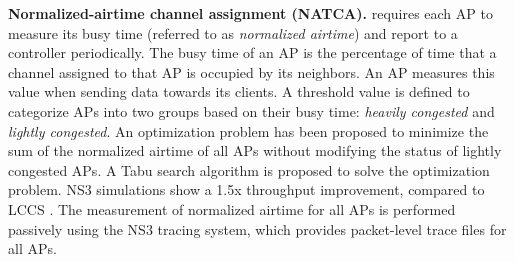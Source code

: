 %
\label{ATCM}
\textbf{Normalized-airtime channel assignment (NATCA).}
\cite{DCA-residential-2015} requires each AP to measure its busy time (referred to as \textit{normalized airtime}) and report to a controller periodically. 
The busy time of an AP is the percentage of time that a channel assigned to that AP is occupied by its neighbors. 
An AP measures this value when sending data towards its clients. 
A threshold value is defined to categorize APs into two groups based on their busy time: \textit{heavily congested} and \textit{lightly congested}. 
An optimization problem has been proposed to minimize the sum of the normalized airtime of all APs without modifying the status of lightly congested APs. 
A Tabu search algorithm is proposed to solve the optimization problem. 
NS3 simulations show a 1.5x throughput improvement, compared to LCCS \cite{LCCS}. 
The measurement of normalized airtime for all APs is performed passively using the NS3 tracing system, which provides packet-level trace files for all APs.  






